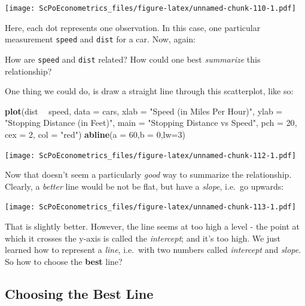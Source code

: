 \documentclass[]{book}
\newenvironment{Shaded}{\begin{snugshade}}{\end{snugshade}}
\newcommand{\KeywordTok}[1]{\textcolor[rgb]{0.13,0.29,0.53}{\textbf{#1}}}
\newcommand{\DataTypeTok}[1]{\textcolor[rgb]{0.13,0.29,0.53}{#1}}
\newcommand{\DecValTok}[1]{\textcolor[rgb]{0.00,0.00,0.81}{#1}}
\newcommand{\StringTok}[1]{\textcolor[rgb]{0.31,0.60,0.02}{#1}}
\newcommand{\OperatorTok}[1]{\textcolor[rgb]{0.81,0.36,0.00}{\textbf{#1}}}
\newcommand{\NormalTok}[1]{#1}
\newenvironment{note}{\begin{tcolorbox}[colback=blue!5!white,colframe=blue!75!black,title=\textbf{Note:}]}{\end{tcolorbox}}
\theoremstyle{definition}
\theoremstyle{definition}
\theoremstyle{definition}
\theoremstyle{remark}
\begin{document}
\texttt{[image: ScPoEconometrics\_files/figure-latex/unnamed-chunk-110-1.pdf]}

Here, each dot represents one observation. In this case, one particular
measurement \texttt{speed} and \texttt{dist} for a car. Now, again:

\begin{note}
How are \texttt{speed} and \texttt{dist} related? How could one best
\emph{summarize} this relationship?
\end{note}

 One thing we could do, is draw a straight line through this
scatterplot, like so:

\begin{Shaded}
\begin{Highlighting}[]
\KeywordTok{plot}\NormalTok{(dist }\OperatorTok{~}\StringTok{ }\NormalTok{speed, }\DataTypeTok{data =}\NormalTok{ cars,}
     \DataTypeTok{xlab =} \StringTok{"Speed (in Miles Per Hour)"}\NormalTok{,}
     \DataTypeTok{ylab =} \StringTok{"Stopping Distance (in Feet)"}\NormalTok{,}
     \DataTypeTok{main =} \StringTok{"Stopping Distance vs Speed"}\NormalTok{,}
     \DataTypeTok{pch  =} \DecValTok{20}\NormalTok{,}
     \DataTypeTok{cex  =} \DecValTok{2}\NormalTok{,}
     \DataTypeTok{col  =} \StringTok{"red"}\NormalTok{)}
\KeywordTok{abline}\NormalTok{(}\DataTypeTok{a =} \DecValTok{60}\NormalTok{,}\DataTypeTok{b =} \DecValTok{0}\NormalTok{,}\DataTypeTok{lw=}\DecValTok{3}\NormalTok{)}
\end{Highlighting}
\end{Shaded}

\texttt{[image: ScPoEconometrics\_files/figure-latex/unnamed-chunk-112-1.pdf]}

Now that doesn't seem a particularly \emph{good} way to summarize the
relationship. Clearly, a \emph{better} line would be not be flat, but
have a \emph{slope}, i.e.~go upwards:

\texttt{[image: ScPoEconometrics\_files/figure-latex/unnamed-chunk-113-1.pdf]}

That is slightly better. However, the line seems at too high a level -
the point at which it crosses the y-axis is called the \emph{intercept};
and it's too high. We just learned how to represent a \emph{line},
i.e.~with two numbers called \emph{intercept} and \emph{slope}. So how
to choose the \textbf{best} line?

\subsection{Choosing the Best Line}\label{choosing-the-best-line}
\end{document}
